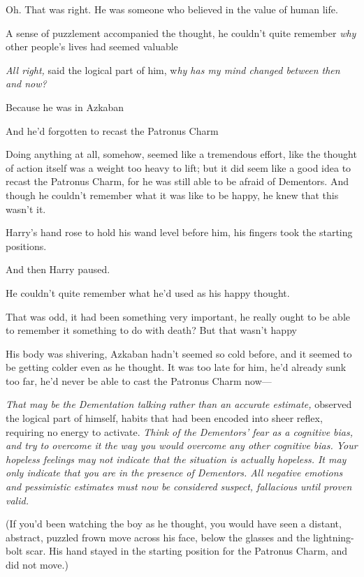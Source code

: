 Oh. That was right. He was someone who believed in the value of human life.

A sense of puzzlement accompanied the thought, he couldn't quite remember
\emph{why} other people's lives had seemed valuable{\el}

\emph{All right,} said the logical part of him, w\emph{hy has my mind changed
between then and now?}

Because he was in Azkaban{\el}

And he'd forgotten to recast the Patronus Charm{\el}

Doing anything at all, somehow, seemed like a tremendous effort, like the
thought of action itself was a weight too heavy to lift; but it did seem like a
good idea to recast the Patronus Charm, for he was still able to be afraid of
Dementors. And though he couldn't remember what it was like to be happy, he
knew that this wasn't it.

Harry's hand rose to hold his wand level before him, his fingers took the
starting positions.

And then Harry paused.

He couldn't{\el} quite remember{\el} what he'd used as his happy thought.

That was odd, it had been something very important, he really ought to be able
to remember it{\el} something to do with death? But that wasn't happy{\el}

His body was shivering, Azkaban hadn't seemed so cold before, and it seemed to
be getting colder even as he thought. It was too late for him, he'd already
sunk too far, he'd never be able to cast the Patronus Charm now—

\emph{That may be the Dementation talking rather than an accurate estimate,}
observed the logical part of himself, habits that had been encoded into sheer
reflex, requiring no energy to activate. \emph{Think of the Dementors' fear as
a cognitive bias, and try to overcome it the way you would overcome any other
cognitive bias. Your hopeless feelings may not indicate that the situation is
actually hopeless. It may only indicate that you are in the presence of
Dementors. All negative emotions and pessimistic estimates must now be
considered suspect, fallacious until proven valid.}

(If you'd been watching the boy as he thought, you would have seen a distant,
abstract, puzzled frown move across his face, below the glasses and the
lightning-bolt scar. His hand stayed in the starting position for the Patronus
Charm, and did not move.)

